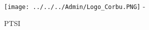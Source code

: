 \renewcommand{\footrulewidth}{0.4pt}



\pagestyle{empty}

\texttt{[image: ../../../Admin/Logo\_Corbu.PNG]} \hfill \Huge{\numero - \sujet}

\vspace{2cm}

\begin{center}
\centering\huge{PTSI}
\end{center}

\vspace{2cm}


\begin{center}
\centering\Large{\jour}
\end{center}

\vspace{2cm}

\normalsize

\tableofcontents

\newpage

\pagestyle{fancy}

\begin{center}
\Huge \sujet
\end{center}

\normalsize